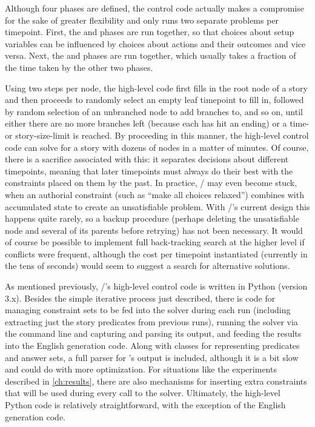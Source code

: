 Although four phases are defined, the control code actually makes a compromise for the sake of greater flexibility and only runs two separate problems per timepoint.
%
First, the  and  phases are run together, so that choices about setup variables can be influenced by choices about actions and their outcomes and vice versa.
%
Next, the  and  phases are run together, which usually takes a fraction of the time taken by the other two phases.


Using two steps per node, the high-level code first fills in the root node of a story and then proceeds to randomly select an empty leaf timepoint to fill in, followed by random selection of an unbranched node to add branches to, and so on, until either there are no more branches left (because each has hit an ending) or a time- or story-size-limit is reached.
%
By proceeding in this manner, the high-level control code can solve for a story with dozens of nodes in a matter of minutes.
%
Of course, there is a sacrifice associated with this: it separates decisions about different timepoints, meaning that later timepoints must always do their best with the constraints placed on them by the past.
%
In practice, \dunyazad/ may even become stuck, when an authorial constraint (such as ``make all choices relaxed'') combines with accumulated state to create an unsatisfiable problem.
%
With \dunyazad/'s current design this happens quite rarely, so a backup procedure (perhaps deleting the unsatisfiable node and several of its parents before retrying) has not been necessary.
%
It would of course be possible to implement full back-tracking search at the higher level if conflicts were frequent, although the cost per timepoint instantiated (currently in the tens of seconds) would seem to suggest a search for alternative solutions.


As mentioned previously, \dunyazad/'s high-level control code is written in Python (version 3.x).
%
Besides the simple iterative process just described, there is code for managing constraint sets to be fed into the solver during each run (including extracting just the story predicates from previous runs), running the solver via the command line and capturing and parsing its output, and feeding the results into the English generation code.
%
Along with classes for representing predicates and answer sets, a full parser for 's output is included, although it is a bit slow and could do with more optimization.
%
For situations like the experiments described in \cref{ch:results}, there are also mechanisms for inserting extra constraints that will be used during every call to the solver.
%
Ultimately, the high-level Python code is relatively straightforward, with the exception of the English generation code.


